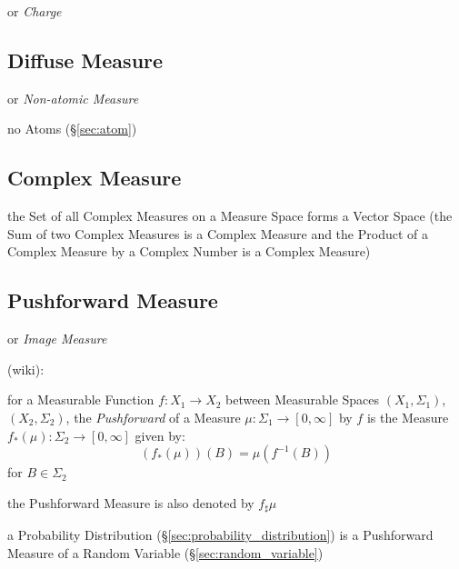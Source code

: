 or \emph{Charge}



\subsection{Diffuse Measure}\label{sec:diffuse_measure}

or \emph{Non-atomic Measure}

no Atoms (\S\ref{sec:atom})



\subsection{Complex Measure}\label{sec:complex_measure}

the Set of all Complex Measures on a Measure Space forms a Vector Space (the Sum
of two Complex Measures is a Complex Measure and the Product of a Complex
Measure by a Complex Number is a Complex Measure)



\subsection{Pushforward Measure}\label{sec:pushforward_measure}

or \emph{Image Measure}

(wiki):

for a Measurable Function $f : X_1 \rightarrow X_2$ between Measurable Spaces
$(X_1, \Sigma_1)$, $(X_2, \Sigma_2)$, the \emph{Pushforward} of a Measure
$\mu : \Sigma_1 \rightarrow [0, \infty]$ by $f$ is the Measure
$f_*(\mu) : \Sigma_2 \rightarrow [0, \infty]$ given by:
\[
  (f_*(\mu))(B) = \mu(f^{-1}(B))
\]
for $B \in \Sigma_2$

the Pushforward Measure is also denoted by $f_\sharp\mu$

\fist a Probability Distribution (\S\ref{sec:probability_distribution}) is a
Pushforward Measure of a Random Variable (\S\ref{sec:random_variable})



